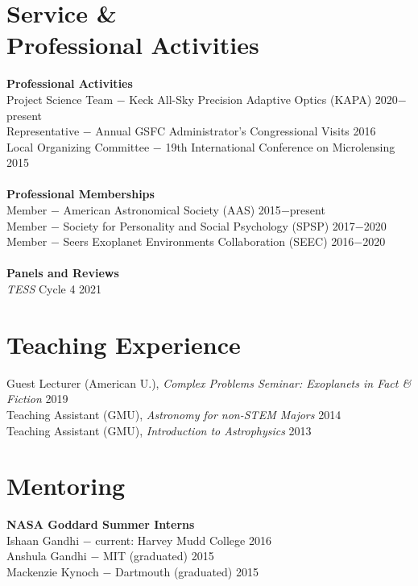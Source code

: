 \documentclass[margin,line]{res}
\begin{document}
\begin{resume}
\section{\sc Service \&\\ Professional Activities}
\textbf{Professional Activities}\\
Project Science Team $-$ Keck All-Sky Precision Adaptive Optics (KAPA) \hfill 2020$-$present\\
Representative $-$ Annual GSFC Administrator's Congressional Visits \hfill 2016\\
Local Organizing Committee $-$ 19th International Conference on Microlensing \hfill 2015\\
\\
\textbf{Professional Memberships}\\
Member $-$ American Astronomical Society (AAS) \hfill 2015$-$present\\
Member $-$ Society for Personality and Social Psychology (SPSP) \hfill 2017$-$2020\\
Member $-$ Seers Exoplanet Environments Collaboration (SEEC) \hfill 2016$-$2020\\
\\
\textbf{Panels and Reviews}\\
\textit{TESS} Cycle 4 \hfill 2021\\

\section{\sc Teaching Experience}
Guest Lecturer (American U.), \textit{Complex Problems Seminar: Exoplanets in Fact \& Fiction} \hfill 2019 \\
Teaching Assistant (GMU), \textit{Astronomy for non-STEM Majors} \hfill 2014 \\
Teaching Assistant (GMU), \textit{Introduction to Astrophysics} \hfill 2013 \\

\section{\sc Mentoring}
\textbf{NASA Goddard Summer Interns} \\
Ishaan Gandhi $-$ current: Harvey Mudd College \hfill 2016 \\
Anshula Gandhi $-$ MIT (graduated) \hfill 2015\\
Mackenzie Kynoch $-$ Dartmouth (graduated) \hfill 2015 \\


\end{resume}
\end{document}
